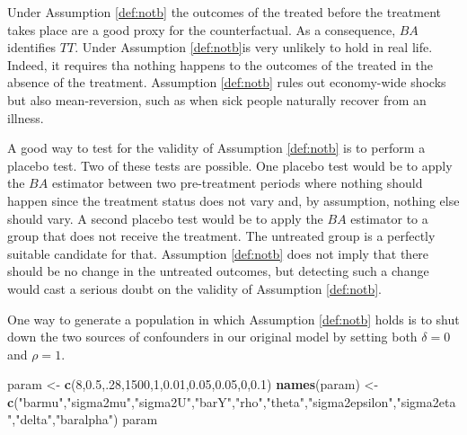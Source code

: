 \documentclass[]{book}
\newenvironment{Shaded}{\begin{snugshade}}{\end{snugshade}}
\newcommand{\DecValTok}[1]{\textcolor[rgb]{0.00,0.00,0.81}{#1}}
\newcommand{\FloatTok}[1]{\textcolor[rgb]{0.00,0.00,0.81}{#1}}
\newcommand{\KeywordTok}[1]{\textcolor[rgb]{0.13,0.29,0.53}{\textbf{#1}}}
\newcommand{\NormalTok}[1]{#1}
\newcommand{\StringTok}[1]{\textcolor[rgb]{0.31,0.60,0.02}{#1}}
\theoremstyle{definition}
\theoremstyle{definition}
\theoremstyle{definition}
\theoremstyle{remark}
\let\BeginKnitrBlock\begin \let\EndKnitrBlock\end
\begin{document}
Under Assumption \ref{def:notb} the outcomes of the treated before the treatment takes place are a good proxy for the counterfactual.
As a consequence, \(BA\) identifies \(TT\).
Under Assumption \ref{def:notb}is very unlikely to hold in real life.
Indeed, it requires tha nothing happens to the outcomes of the treated in the absence of the treatment.
Assumption \ref{def:notb} rules out economy-wide shocks but also mean-reversion, such as when sick people naturally recover from an illness.

A good way to test for the validity of Assumption \ref{def:notb} is to perform a placebo test.
Two of these tests are possible.
One placebo test would be to apply the \(BA\) estimator between two pre-treatment periods where nothing should happen since the treatment status does not vary and, by assumption, nothing else should vary.
A second placebo test would be to apply the \(BA\) estimator to a group that does not receive the treatment.
The untreated group is a perfectly suitable candidate for that.
Assumption \ref{def:notb} does not imply that there should be no change in the untreated outcomes, but detecting such a change would cast a serious doubt on the validity of Assumption \ref{def:notb}.

\BeginKnitrBlock{example}
\protect\hypertarget{exm:unnamed-chunk-31}{}{\label{exm:unnamed-chunk-31} }One way to generate a population in which Assumption \ref{def:notb} holds is to shut down the two sources of confounders in our original model by setting both \(\delta=0\) and \(\rho=1\).
\EndKnitrBlock{example}

\begin{Shaded}
\begin{Highlighting}[]
\NormalTok{param <-}\StringTok{ }\KeywordTok{c}\NormalTok{(}\DecValTok{8}\NormalTok{,}\FloatTok{0.5}\NormalTok{,.}\DecValTok{28}\NormalTok{,}\DecValTok{1500}\NormalTok{,}\DecValTok{1}\NormalTok{,}\FloatTok{0.01}\NormalTok{,}\FloatTok{0.05}\NormalTok{,}\FloatTok{0.05}\NormalTok{,}\DecValTok{0}\NormalTok{,}\FloatTok{0.1}\NormalTok{)}
\KeywordTok{names}\NormalTok{(param) <-}\StringTok{ }\KeywordTok{c}\NormalTok{(}\StringTok{"barmu"}\NormalTok{,}\StringTok{"sigma2mu"}\NormalTok{,}\StringTok{"sigma2U"}\NormalTok{,}\StringTok{"barY"}\NormalTok{,}\StringTok{"rho"}\NormalTok{,}\StringTok{"theta"}\NormalTok{,}\StringTok{"sigma2epsilon"}\NormalTok{,}\StringTok{"sigma2eta"}\NormalTok{,}\StringTok{"delta"}\NormalTok{,}\StringTok{"baralpha"}\NormalTok{)}
\NormalTok{param}
\end{Highlighting}
\end{Shaded}
\end{document}
